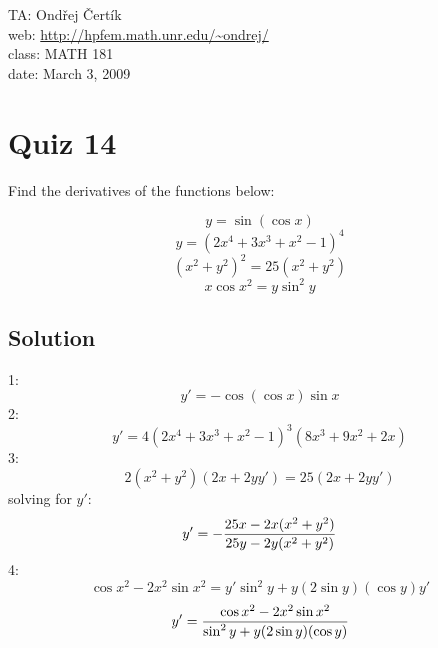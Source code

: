 \documentclass[10pt]{article}
\begin{document}
\noindent TA: Ondřej Čertík\\
web: \url{http://hpfem.math.unr.edu/~ondrej/}\\
class: MATH 181\\
date: March 3, 2009

\section*{Quiz 14}

Find the derivatives of the functions below:

$$y=\sin(\cos x)$$
$$y=(2x^4+3x^3+x^2-1)^4$$
$$(x^2+y^2)^2=25(x^2+y^2)$$
$$x\cos x^2 = y\sin^2 y$$

\subsection*{Solution}

1:
$$y'=-\cos(\cos x)\sin x$$
2:
$$y'=4(2x^4+3x^3+x^2-1)^3(8x^3+9x^2+2x)$$
3:
$$2(x^2+y^2)(2x+2yy') = 25(2x+2yy')$$
solving for $y'$:
$$y'=-{25x-2x(x^2+y^2)\over25y-2y(x^2+y^2)}$$
4:
$$\cos x^2-2x^2\sin x^2=y'\sin^2 y + y(2\sin y)(\cos y) y'$$
$$y'={\cos x^2-2x^2\sin x^2\over\sin^2 y + y(2\sin y)(\cos y)}$$
\end{document}

